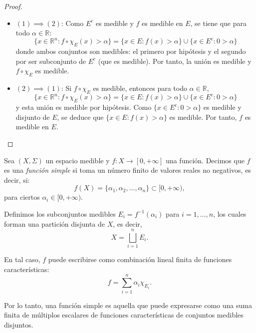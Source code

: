 \begin{proof}
    \leavevmode
    \begin{itemize}
        \item $(1) \implies (2)$: Como $E^c$ es medible y $f$ es medible en $E$, se tiene que para todo $\alpha \in \mathbb{R}$:
              \[
                  \{x \in \mathbb{R}^n : f \circ \chi_E(x) > \alpha\}
                  = \{x \in E : f(x) > \alpha\} \cup \{x \in E^c : 0 > \alpha\}
              \]
              donde ambos conjuntos son medibles: el primero por hipótesis y el segundo por
              ser subconjunto de $E^c$ (que es medible). Por tanto, la unión es medible y $f
                  \circ \chi_E$ es medible.

        \item $(2) \implies (1)$: Si $f \circ \chi_E$ es medible, entonces para todo $\alpha \in \mathbb{R}$,
              \[
                  \{x \in \mathbb{R}^n : f \circ \chi_E(x) > \alpha\}
                  = \{x \in E : f(x) > \alpha\} \cup \{x \in E^c : 0 > \alpha\}
              \]
              y esta unión es medible por hipótesis. Como $\{x \in E^c : 0 > \alpha\}$ es
              medible y disjunto de $E$, se deduce que $\{x \in E : f(x) > \alpha\}$ es
              medible. Por tanto, $f$ es medible en $E$.
    \end{itemize}
\end{proof}

\begin{definición}\label{Funcion Simple}
Sea $(X, \Sigma)$ un espacio medible y $f: X \to [0, +\infty]$ una función. Decimos que $f$ es una \emph{función simple} si toma un número finito de valores reales no negativos, es decir, si:
\[
    f(X) = \{\alpha_1, \alpha_2, \dots, \alpha_n\} \subset [0, +\infty),
\]
para ciertos $\alpha_i \in [0, +\infty)$.

Definimos los subconjuntos medibles $E_i = f^{-1}(\alpha_i)$ para $i = 1,
    \dots, n$, los cuales forman una partición disjunta de $X$, es decir,
\[
    X = \bigsqcup_{i=1}^{n} E_i.
\]

En tal caso, $f$ puede escribirse como combinación lineal finita de funciones
características:
\[
    f = \sum_{i=1}^{n} \alpha_i \chi_{E_i}.
\]

Por lo tanto, una función simple es aquella que puede expresarse como una suma
finita de múltiplos escalares de funciones características de conjuntos
medibles disjuntos.
\end{definición}

